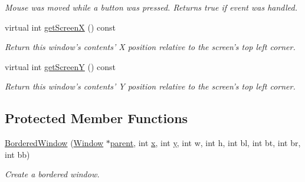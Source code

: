 \begin{DoxyCompactItemize}
\begin{DoxyCompactList}\small\item\em Mouse was moved while a button was pressed. Returns true if event was handled. \end{DoxyCompactList}\item 
\hypertarget{classGUI_1_1BorderedWindow_a360d2ae9d3ebff67bab02a1855b9f0ee}{virtual int \hyperlink{classGUI_1_1BorderedWindow_a360d2ae9d3ebff67bab02a1855b9f0ee}{get\-Screen\-X} () const }\label{classGUI_1_1BorderedWindow_a360d2ae9d3ebff67bab02a1855b9f0ee}

\begin{DoxyCompactList}\small\item\em Return this window's contents' X position relative to the screen's top left corner. \end{DoxyCompactList}\item 
\hypertarget{classGUI_1_1BorderedWindow_a79e2b435d5e2e3fc3f97c4d2d783df1d}{virtual int \hyperlink{classGUI_1_1BorderedWindow_a79e2b435d5e2e3fc3f97c4d2d783df1d}{get\-Screen\-Y} () const }\label{classGUI_1_1BorderedWindow_a79e2b435d5e2e3fc3f97c4d2d783df1d}

\begin{DoxyCompactList}\small\item\em Return this window's contents' Y position relative to the screen's top left corner. \end{DoxyCompactList}\end{DoxyCompactItemize}
\subsection*{Protected Member Functions}
\begin{DoxyCompactItemize}
\item 
\hypertarget{classGUI_1_1BorderedWindow_a6e2e1cbbc8a073b4ddac62086e003d46}{\hyperlink{classGUI_1_1BorderedWindow_a6e2e1cbbc8a073b4ddac62086e003d46}{Bordered\-Window} (\hyperlink{classGUI_1_1Window}{Window} $\ast$\hyperlink{classGUI_1_1Window_a2e593ff65e7702178d82fe9010a0b539}{parent}, int \hyperlink{classGUI_1_1Window_a6ca6a80ca00c9e1d8ceea8d3d99a657d}{x}, int \hyperlink{classGUI_1_1Window_a0ee8e923aff2c3661fc2e17656d37adf}{y}, int w, int h, int bl, int bt, int br, int bb)}\label{classGUI_1_1BorderedWindow_a6e2e1cbbc8a073b4ddac62086e003d46}

\begin{DoxyCompactList}\small\item\em Create a bordered window. \end{DoxyCompactList}\end{DoxyCompactItemize}
